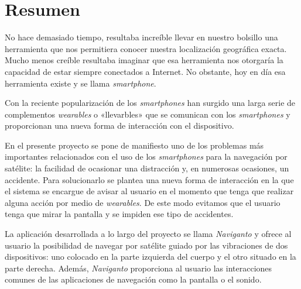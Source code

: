 \chapter{Resumen}

No hace demasiado tiempo, resultaba increíble llevar en nuestro bolsillo una herramienta que nos
permitiera conocer nuestra localización geográfica exacta. Mucho menos creíble resultaba imaginar
que esa herramienta nos otorgaría la capacidad de estar siempre conectados a Internet. No
obstante, hoy en día esa herramienta existe y se llama \emph{smartphone}.

Con la reciente popularización de los \emph{smartphones} han surgido una larga serie de complementos
\emph{wearables} o «llevarbles» que se comunican con los \emph{smartphones} y proporcionan una nueva
forma de interacción con el dispositivo.

En el presente proyecto se pone de manifiesto uno de los problemas más importantes relacionados con
el uso de los \emph{smartphones} para la navegación por satélite: la facilidad de ocasionar una
distracción y, en numerosas ocasiones, un accidente. Para solucionarlo se plantea una nueva forma de
interacción en la que el sistema se encargue de avisar al usuario en el momento que tenga que
realizar alguna acción por medio de \emph{wearables}. De este modo evitamos que el usuario tenga que
mirar la pantalla y se impiden ese tipo de accidentes.

La aplicación desarrollada a lo largo del proyecto se llama \emph{Naviganto} y ofrece al usuario la
posibilidad de navegar por satélite guiado por las vibraciones de dos dispositivos: uno colocado en
la parte izquierda del cuerpo y el otro situado en la parte derecha. Además, \emph{Naviganto}
proporciona al usuario las interacciones comunes de las aplicaciones de navegación como la pantalla
o el sonido.

